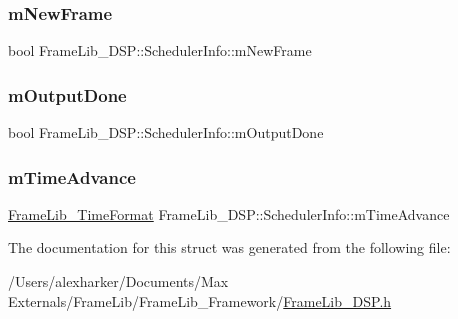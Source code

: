 \subsubsection{\texorpdfstring{m\+New\+Frame}{mNewFrame}}
{\footnotesize\ttfamily bool Frame\+Lib\+\_\+\+D\+S\+P\+::\+Scheduler\+Info\+::m\+New\+Frame}

\mbox{\label{struct_frame_lib___d_s_p_1_1_scheduler_info_aee41d636cde5b117b4ce8610905d668d}} 
\subsubsection{\texorpdfstring{m\+Output\+Done}{mOutputDone}}
{\footnotesize\ttfamily bool Frame\+Lib\+\_\+\+D\+S\+P\+::\+Scheduler\+Info\+::m\+Output\+Done}

\mbox{\label{struct_frame_lib___d_s_p_1_1_scheduler_info_ae38d8335efc201f8c2c967ffea7b6076}} 
\subsubsection{\texorpdfstring{m\+Time\+Advance}{mTimeAdvance}}
{\footnotesize\ttfamily \hyperlink{_frame_lib___types_8h_a699a4071a9eaaa283906a5ebd0a79ac0}{Frame\+Lib\+\_\+\+Time\+Format} Frame\+Lib\+\_\+\+D\+S\+P\+::\+Scheduler\+Info\+::m\+Time\+Advance}



The documentation for this struct was generated from the following file\+:\begin{DoxyCompactItemize}
\item 
/\+Users/alexharker/\+Documents/\+Max Externals/\+Frame\+Lib/\+Frame\+Lib\+\_\+\+Framework/\hyperlink{_frame_lib___d_s_p_8h}{Frame\+Lib\+\_\+\+D\+S\+P.\+h}\end{DoxyCompactItemize}
